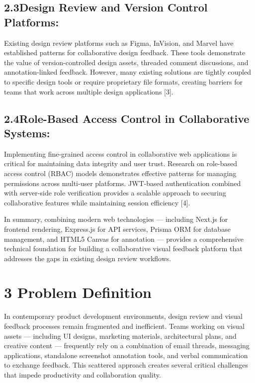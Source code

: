 \documentclass[12pt,a4paper]{article}
\begin{document}
\subsection{2.3\quad Design Review and Version Control Platforms:}

Existing design review platforms such as Figma, InVision, and Marvel have established patterns for collaborative design feedback. These tools demonstrate the value of version-controlled design assets, threaded comment discussions, and annotation-linked feedback. However, many existing solutions are tightly coupled to specific design tools or require proprietary file formats, creating barriers for teams that work across multiple design applications [3].

\subsection{2.4\quad Role-Based Access Control in Collaborative Systems:}

Implementing fine-grained access control in collaborative web applications is critical for maintaining data integrity and user trust. Research on role-based access control (RBAC) models demonstrates effective patterns for managing permissions across multi-user platforms. JWT-based authentication combined with server-side role verification provides a scalable approach to securing collaborative features while maintaining session efficiency [4].

In summary, combining modern web technologies --- including Next.js for frontend rendering, Express.js for API services, Prisma ORM for database management, and HTML5 Canvas for annotation --- provides a comprehensive technical foundation for building a collaborative visual feedback platform that addresses the gaps in existing design review workflows.

\section{3 Problem Definition}

In contemporary product development environments, design review and visual feedback processes remain fragmented and inefficient. Teams working on visual assets --- including UI designs, marketing materials, architectural plans, and creative content --- frequently rely on a combination of email threads, messaging applications, standalone screenshot annotation tools, and verbal communication to exchange feedback. This scattered approach creates several critical challenges that impede productivity and collaboration quality.
\end{document}
